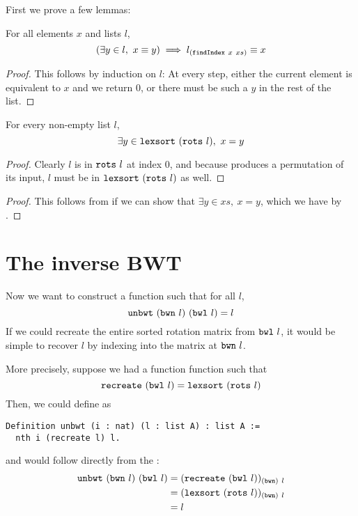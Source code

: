 \documentclass[sigplan,10pt,anonymous,review]{thesis}
\begin{document}
First we prove a few lemmas:
\begin{lemma}
  For all elements $x$ and lists $l$,
  \begin{equation*}
    (\exists y \in l,~x \equiv y) \implies l_{(\texttt{findIndex}~x~xs)} \equiv x
  \end{equation*}
\end{lemma}
\begin{proof}
  This follows by induction on $l$: At every step, either the
  current element is equivalent to $x$ and we return $0$, or there
  must be such a $y$ in the rest of the list.
\end{proof}

\begin{lemma}
  For every non-empty list $l$,
  \begin{equation*}
    \exists y \in \texttt{lexsort}~(\texttt{rots}~l),~x = y
  \end{equation*}
\end{lemma}
\begin{proof}
  Clearly $l$ is in $\texttt{rots}~l$ at index 0, and because
   produces a permutation of its input, $l$ must be
  in $\texttt{lexsort}~(\texttt{rots}~l)$ as well.
\end{proof}

\bwncorrect
\begin{proof}
  This follows from  if we can show that
  $\exists y \in xs,~x = y$, which we have by .
\end{proof}

\section{The inverse BWT}
\label{sec:inverse_BWT}

Now we want to construct a function  such that for all $l$,
\begin{equation}
  \texttt{unbwt}~(\texttt{bwn}~l)~(\texttt{bwl}~l) = l
  \label{eq:unbwt}
\end{equation}
If we could recreate the entire sorted rotation matrix from
$\texttt{bwl}~l$, it would be simple to recover $l$ by indexing into
the matrix at $\texttt{bwn}~l$.

More precisely, suppose we had a function function 
such that
\begin{equation}
  \label{eq:recreate}
  \texttt{recreate}~(\texttt{bwl}~l) = \texttt{lexsort}~(\texttt{rots}~l)
\end{equation}
Then, we could define  as
\begin{lstlisting}
Definition unbwt (i : nat) (l : list A) : list A :=
  nth i (recreate l) l.
\end{lstlisting}
and  would follow directly from the :
\begin{align*}
     \texttt{unbwt}~(\texttt{bwn}~l)~(\texttt{bwl}~l)
  &= (\texttt{recreate}~(\texttt{bwl}~l))_{(\texttt{bwn})~l}\\
  &= (\texttt{lexsort}~(\texttt{rots}~l))_{(\texttt{bwn})~l} \\
  &= l
\end{align*}
\end{document}
